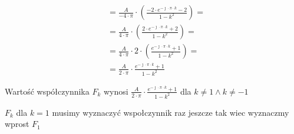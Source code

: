 \begin{task}
\begin{align*}
&=\frac{A}{-4 \cdot \pi} \cdot \left( \frac{-2\cdot e^{-\jmath \cdot \pi \cdot k} - 2 }{1-k^2} \right)=\\
&=\frac{A}{4 \cdot \pi} \cdot \left( \frac{2 \cdot e^{-\jmath \cdot \pi \cdot k} +2}{1-k^2} \right)=\\
&=\frac{A}{4 \cdot \pi} \cdot 2 \cdot \left(\frac{e^{-\jmath \cdot \pi \cdot k}+1}{1-k^2} \right)=\\
&=\frac{A}{2 \cdot \pi} \cdot \frac{e^{-\jmath \cdot \pi \cdot k}+1}{1-k^2}
\end{align*}

Wartość współczynnika $F_k$ wynosi $\frac{A}{2 \cdot \pi} \cdot \frac{e^{-\jmath \cdot \pi \cdot k}+1}{1-k^2}$ dla $k \neq 1 \wedge k \neq -1$ 

$F_k$ dla $k=1$ musimy wyznaczyć wspołczynnik raz jeszcze tak wiec wyznaczmy wprost $F_1$


\end{task}
